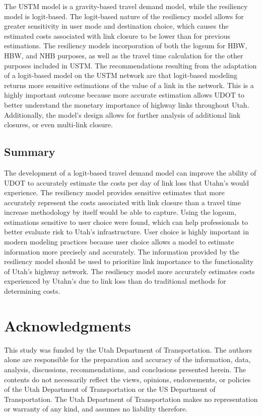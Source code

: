 \documentclass[3p, authoryear]{elsarticle} %
\begin{document}
The USTM model is a gravity-based travel demand model, while the resiliency
model is logit-based. The logit-based nature of the resiliency model allows for
greater sensitivity in user mode and destination choice, which causes the
estimated costs associated with link closure to be lower than for previous
estimations. The resiliency models incorporation of both the logsum for HBW,
HBW, and NHB purposes, as well as the travel time calculation for the other
purposes included in USTM. The recommendations resulting from the adaptation of
a logit-based model on the USTM network are that logit-based modeling returns
more sensitive estimations of the value of a link in the network. This is a
highly important outcome because more accurate estimation allows UDOT to better
understand the monetary importance of highway links throughout Utah.
Additionally, the model's design allows for further analysis of additional link
closures, or even multi-link closure.

\hypertarget{summary-1}{%
\subsection{Summary}\label{summary-1}}

The development of a logit-based travel demand model can improve the ability of
UDOT to accurately estimate the costs per day of link loss that Utahn's would
experience. The resiliency model provides sensitive estimates that more
accurately represent the costs associated with link closure than a travel time
increase methodology by itself would be able to capture. Using the logsum,
estimations sensitive to user choice were found, which can help professionals to
better evaluate risk to Utah's infrastructure. User choice is highly important
in modern modeling practices because user choice allows a model to estimate
information more precisely and accurately. The information provided by the
resiliency model should be used to prioritize link importance to the
functionality of Utah's highway network. The resiliency model more accurately
estimates costs experienced by Utahn's due to link loss than do traditional
methods for determining costs.

\hypertarget{acknowledgments}{%
\section*{Acknowledgments}\label{acknowledgments}}

This study was funded by the Utah Department of Transportation. The authors
alone are responsible for the preparation and accuracy of the information, data,
analysis, discussions, recommendations, and conclusions presented herein. The
contents do not necessarily reflect the views, opinions, endorsements, or
policies of the Utah Department of Transportation or the US Department of
Transportation. The Utah Department of Transportation makes no representation or
warranty of any kind, and assumes no liability therefore.
\end{document}
